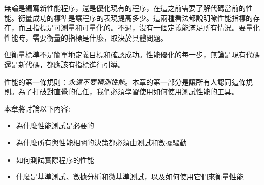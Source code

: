 無論是編寫新性能程序，還是優化現有的程序，在這之前需要了解代碼當前的性能。衡量成功的標準是讓程序的表現提高多少。這兩種看法都說明瞭性能指標的存在，而且指標是可測量和可量化的。不過，沒有一個定義能滿足所有情況。要量化性能時，需要衡量的指標是什麼，取決於具體問題。

但衡量標準不是簡單地定義目標和確認成功。性能優化的每一步，無論是現有代碼還是新代碼，都應該有指標進行引導。

性能的第一條規則：\textit{永遠不要猜測性能}。本章的第一部分是讓所有人認同這條規則。為了打破對直覺的信任，我們必須學習使用如何使用測試性能的工具。

本章將討論以下內容:

\begin{itemize}
\item 為什麼性能測試是必要的
\item 為什麼所有與性能相關的決策都必須由測試和數據驅動
\item 如何測試實際程序的性能
\item 什麼是基準測試、數據分析和微基準測試，以及如何使用它們來衡量性能
\end{itemize}

